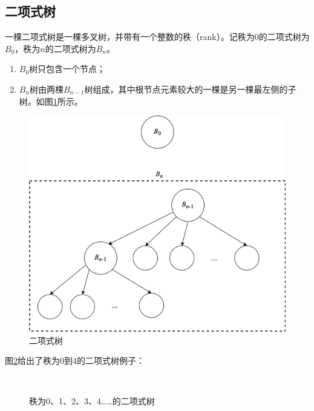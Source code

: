 \documentclass[b5paper]{ctexart}
\begin{document}
\subsection{二项式树}
\label{Binomial tree} 

一棵二项式树是一棵多叉树，并带有一个整数的秩（rank）。记秩为0的二项式树为$B_0$，秩为$n$的二项式树为$B_n$。

\begin{enumerate}
\item $B_0$树只包含一个节点；
\item $B_n$树由两棵$B_{n-1}$树组成，其中根节点元素较大的一棵是另一棵最左侧的子树。如图\ref{fig:link-bitree}所示。
\end{enumerate}

\begin{figure}[htbp]
  \centering
  \includegraphics[scale=0.5]{img/btrees}
  \caption{二项式树}
  \label{fig:link-bitree}
\end{figure}

图\ref{fig:bitree-forms}给出了秩为0到4的二项式树例子：

\begin{figure}[htbp]
  \centering
   \\
  \caption{秩为0、1、2、3、4……的二项式树}
  \label{fig:bitree-forms}
\end{figure}
\end{document}
